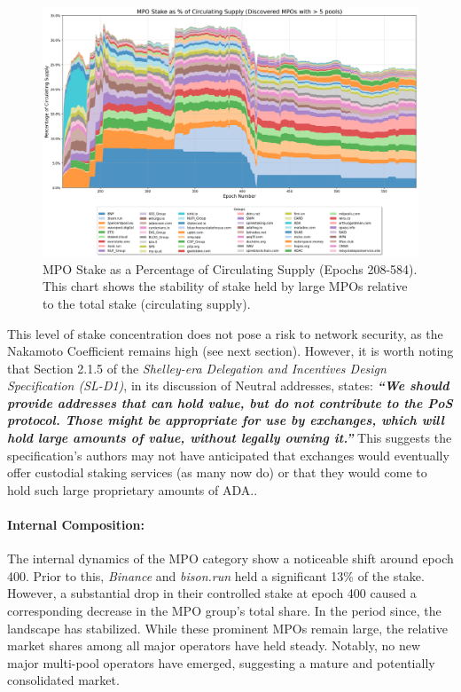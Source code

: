 \documentclass[11pt, letterpaper]{article}
\begin{document}
\begin{figure}[H]
	\centering
	\includegraphics[width=\textwidth, keepaspectratio]{img/mpo_evolution_pct_circulating}
	\caption{MPO Stake as a Percentage of Circulating Supply (Epochs 208-584). This chart shows
		the stability of stake held by large MPOs relative to the total stake (circulating supply).}
	\label{fig:mpo_circulating}
\end{figure}

This level of stake concentration does not pose a risk to network security, as the
Nakamoto Coefficient remains high (see next section). However, it is worth noting that
Section 2.1.5 of the \textit{Shelley-era Delegation and Incentives Design Specification (SL-D1)},
in its discussion of Neutral addresses, states: \textit{\textbf{``We should provide addresses that
		can hold value, but do not contribute to the PoS protocol. Those might be appropriate
		for use by exchanges, which will hold large amounts of value, without legally owning it.''}}
This suggests the specification's authors may not have anticipated that exchanges would eventually
offer custodial staking services (as many now do) or that they would come to hold such large
proprietary amounts of ADA.\@.

\paragraph{Internal Composition:} The internal dynamics of the MPO category show a noticeable
shift around epoch 400. Prior to this, \textit{Binance} and \textit{bison.run} held a significant 13\% of the
stake. However, a substantial drop in their controlled stake at epoch 400 caused a
corresponding decrease in the MPO group's total share. In the period since, the landscape
has stabilized. While these prominent MPOs remain large, the relative market shares among
all major operators have held steady. Notably, no new major multi-pool operators have
emerged, suggesting a mature and potentially consolidated market.
\end{document}
